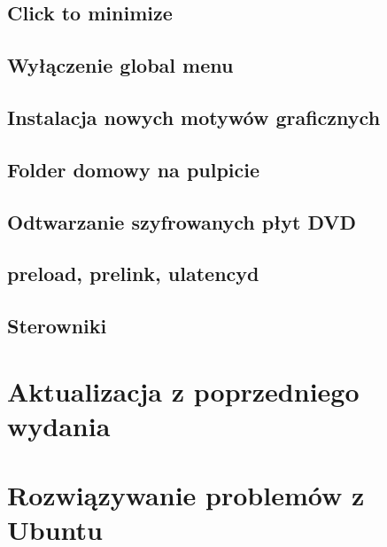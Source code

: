 \documentclass[a4paper,11pt,oneside]{mwart}
\begin{document}
	\subsection{Click to minimize}
	\subsection{Wyłączenie global menu}
	\subsection{Instalacja nowych motywów graficznych}
	\subsection{Folder domowy na pulpicie}
	\subsection{Odtwarzanie szyfrowanych płyt DVD}
	\subsection{preload, prelink, ulatencyd}
	\subsection{Sterowniki}
	\label{sterowniki}
\section{Aktualizacja z poprzedniego wydania}
\section{Rozwiązywanie problemów z Ubuntu}
\end{document}
